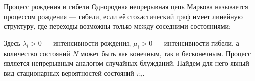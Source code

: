 \begin{example}{Процесс рождения и гибели}
    Однородная непрерывная цепь Маркова называется процессом рождения — гибели, если её стохастический граф имеет линейную структуру, где переходы возможны только между соседними состояниями:
    \begin{center}
    \end{center}
    Здесь $\lambda_i > 0$ — интенсивности рождения, $\mu_i > 0$ — интенсивности гибели, а количество состояний $N$ может быть как конечным, так и бесконечным. Процесс является непрерывным аналогом случайных блужданий. Найдем для него явный вид стационарных вероятностей состояний $\pi_i$.
\end{example}

